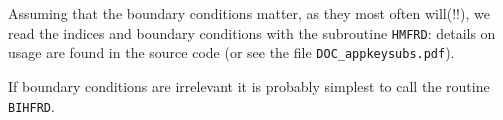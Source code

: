 Assuming that the boundary conditions matter, as they
most often will(!!), we read the indices and boundary
conditions with the subroutine
\verb+HMFRD+: details on usage are found
in the source code 
(or see the file \verb+DOC_appkeysubs.pdf+).

If boundary conditions are irrelevant it is probably
simplest to call the routine \verb+BIHFRD+.

%
%
%
%

